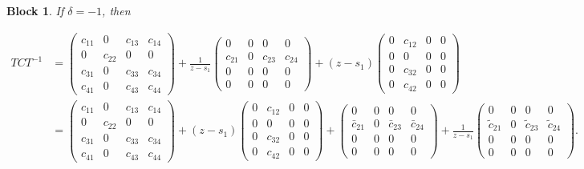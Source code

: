 \documentclass[12pt]{article}
\newtheorem{block}{Block}
\begin{document}
\begin{block}
If $\delta = -1$, then

\[
    \begin{aligned}
    T C T^{-1} &=
    \begin{pmatrix}
        c_{11} & 0 & c_{13} & c_{14} \\[10pt]
        0 & c_{22} & 0 & 0 \\[10pt]
        c_{31} & 0 & c_{33} & c_{34} \\[10pt]
        c_{41} & 0 & c_{43} & c_{44}
    \end{pmatrix}
    +\frac{1}{z-s_1} \begin{pmatrix}
        0 & 0 & 0 & 0 \\[10pt]
        c_{21} & 0 & c_{23} & c_{24} \\[10pt]
        0 & 0 & 0 & 0 \\[10pt]
        0 & 0 & 0 & 0
    \end{pmatrix}
    + (z-s_1) \begin{pmatrix}
        0 & c_{12}  & 0 & 0 \\[10pt]
        0 & 0 & 0 & 0 \\[10pt]
        0 & c_{32} & 0 & 0 \\[10pt]
        0 & c_{42} & 0 & 0
    \end{pmatrix}
    \\[10pt] &=
    \begin{pmatrix}
        c_{11} & 0 & c_{13} & c_{14} \\[10pt]
        0 & c_{22} & 0 & 0 \\[10pt]
        c_{31} & 0 & c_{33} & c_{34} \\[10pt]
        c_{41} & 0 & c_{43} & c_{44}
    \end{pmatrix}
    + (z-s_1) \begin{pmatrix}
        0 & c_{12}  & 0 & 0 \\[10pt]
        0 & 0 & 0 & 0 \\[10pt]
        0 & c_{32} & 0 & 0 \\[10pt]
        0 & c_{42} & 0 & 0
    \end{pmatrix}
    +\begin{pmatrix}
        0 & 0 & 0 & 0 \\[10pt]
        \bar{c}_{21} & 0 & \bar{c}_{23} & \bar{c}_{24} \\[10pt]
        0 & 0 & 0 & 0 \\[10pt]
        0 & 0 & 0 & 0
    \end{pmatrix}
    +\frac{1}{z-s_1} \begin{pmatrix}
        0 & 0 & 0 & 0 \\[10pt]
        \tilde{c}_{21} & 0 & \tilde{c}_{23} & \tilde{c}_{24} \\[10pt]
        0 & 0 & 0 & 0 \\[10pt]
        0 & 0 & 0 & 0
    \end{pmatrix}.
    \end{aligned}
\]


\end{block}
\end{document}
